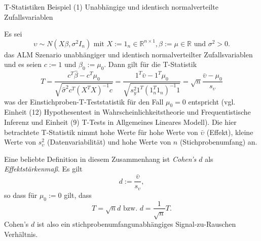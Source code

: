 \documentclass[
  8pt,
  ignorenonframetext,
]{beamer}
\begin{document}
\begin{frame}{T-Statistiken}
\protect\hypertarget{t-statistiken-3}{}
Beispiel (1) Unabhängige und identisch normalverteilte Zufallsvariablen
\vspace{2mm} \footnotesize

Es sei \begin{equation}
\upsilon \sim N(X\beta,\sigma^2 I_n)
\mbox{ mit }
X := 1_n \in \mathbb{R}^{n\times 1},
\beta := \mu \in \mathbb{R}
\mbox{ und } \sigma^2 > 0.
\end{equation} das ALM Szenario unabhängiger und identisch
normalverteilter Zufallsvariablen und es seien \(c := 1\) und
\(\beta_0 := \mu_0\). Dann gilt für die T-Statistik \begin{equation}
T
= \frac{c^T\hat{\beta} - c^T\mu_0}{\sqrt{\hat{\sigma}^2c^T(X^TX)^{-1}c}}
= \frac{1^T\bar{\upsilon}- 1^T\mu_0}{\sqrt{s^2_y 1^T (1_n^T 1_n)^{-1}1}}
= \sqrt{n}\frac{\bar{\upsilon} - \mu_0}{s_\upsilon}
\end{equation} was der Einstichproben-T-Teststatistik für den Fall
\(\mu_0 = 0\) entspricht (vgl. Einheit (12) Hypothesentest in
Wahrscheinlichkeitstheorie und Frequentistische Inferenz und Einheit (9)
T-Tests in Allgemeines Lineares Modell). Die hier betrachtete
T-Statistik nimmt hohe Werte für hohe Werte von \(\bar{\upsilon}\)
(Effekt), kleine Werte von \(s_\upsilon^2\) (Datenvariabilität) und hohe
Werte von \(n\) (Stichprobenumfang) an.

Eine beliebte Definition in diesem Zusammenhang ist \textit{Cohen's $d$}
als \textit{Effektstärkenmaß}. Es gilt \begin{equation}
d := \frac{\bar{\upsilon}}{s_\upsilon},
\end{equation} so dass für \(\mu_0 := 0\) gilt, dass \begin{equation}
T = \sqrt{n}d \mbox{ bzw. } d = \frac{1}{\sqrt{n}} T.
\end{equation} Cohen's \(d\) ist also ein stichprobenumfangunabhängiges
Signal-zu-Rauschen Verhältnis.
\end{frame}
\end{document}
